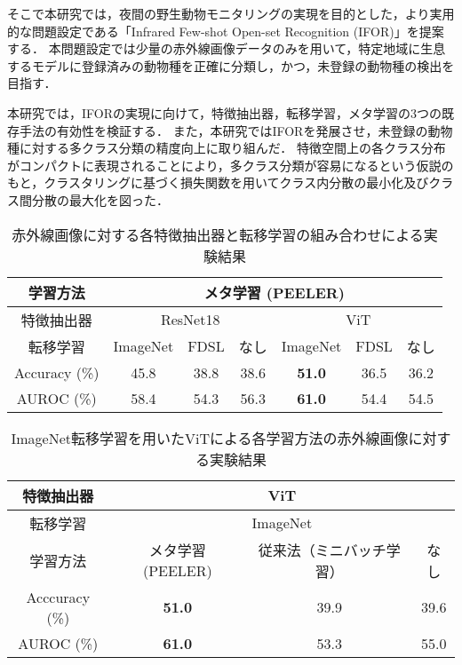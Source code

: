 \documentclass[uplatex,dvipdfmx,10pt,twocolumn]{jsarticle}
\begin{document}
そこで本研究では，夜間の野生動物モニタリングの実現を目的とした，より実用的な問題設定である「Infrared Few-shot Open-set Recognition (IFOR)」を提案する．
本問題設定では少量の赤外線画像データのみを用いて，特定地域に生息するモデルに登録済みの動物種を正確に分類し，かつ，未登録の動物種の検出を目指す．

本研究では，IFORの実現に向けて，特徴抽出器，転移学習，メタ学習の3つの既存手法の有効性を検証する．
また，本研究ではIFORを発展させ，未登録の動物種に対する多クラス分類の精度向上に取り組んだ．
特徴空間上の各クラス分布がコンパクトに表現されることにより，多クラス分類が容易になるという仮説のもと，クラスタリングに基づく損失関数を用いてクラス内分散の最小化及びクラス間分散の最大化を図った．

\begin{table*}[tbp]
  \centering
	\caption{赤外線画像に対する各特徴抽出器と転移学習の組み合わせによる実験結果}
  \label{tbl:classification}
	\small
  \begin{tabular}{c||c|c|c|c|c|c}
    \hline
    学習方法            & \multicolumn{6}{c}{メタ学習 (PEELER)}                        \\ \hline
    特徴抽出器           & \multicolumn{3}{c|}{ResNet18} & \multicolumn{3}{c}{ViT}     \\ \hline
    転移学習            &  ImageNet  &  FDSL  &  なし   &   ImageNet    & FDSL & なし  \\ \hline\hline
    Accuracy (\%) &    45.8    &  38.8  &  38.6  & \textbf{51.0} & 36.5 & 36.2 \\
    AUROC (\%)   &    58.4    &  54.3  &  56.3  & \textbf{61.0} & 54.4 & 54.5 \\ \hline
  \end{tabular}
  \vspace{-4mm}
\end{table*}
\begin{table*}[tbp]
  \centering
  \caption{ImageNet転移学習を用いたViTによる各学習方法の赤外線画像に対する実験結果}
  \label{tbl:detection}
	\small
  \begin{tabular}{c||c|c|c}
    \hline
    特徴抽出器          &          \multicolumn{3}{c}{ViT}                \\ \hline
    転移学習            &          \multicolumn{3}{c}{ImageNet}           \\ \hline
    学習方法            & メタ学習 (PEELER)  & 従来法（ミニバッチ学習） & なし  \\ \hline\hline
    Acccuracy (\%)    &  \textbf{51.0}   &        39.9          & 39.6  \\
    AUROC (\%)        &  \textbf{61.0}   &        53.3          & 55.0  \\ \hline
  \end{tabular}
\end{table*}
\end{document}
